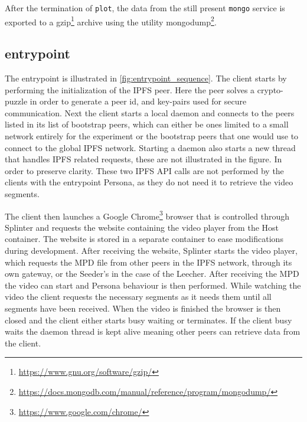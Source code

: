 After the termination of \texttt{plot}, the data from the still present \texttt{mongo} service is exported to a gzip\footnote{\url{https://www.gnu.org/software/gzip/}} archive using the utility mongodump\footnote{\url{https://docs.mongodb.com/manual/reference/program/mongodump/}}. 

\subsection{entrypoint}
\label{sec:experiment_entrypoint}

The entrypoint is illustrated in \autoref{fig:entrypoint_sequence}. The client starts by performing the initialization of the \ac{IPFS} peer. Here the peer solves a crypto-puzzle in order to generate a peer id, and key-pairs used for secure communication.
Next the client starts a local daemon and connects to the peers listed in its list of bootstrap peers, which can either be ones limited to a small network entirely for the experiment or the bootstrap peers that one would use to connect to the global \ac{IPFS} network.
Starting a daemon also starts a new thread that handles \ac{IPFS} related requests, these are not illustrated in the figure. In order to preserve clarity. These two \ac{IPFS} \ac{API} calls are not performed by the clients with the entrypoint Persona, as they do not need it to retrieve the video segments.

The client then launches a Google Chrome\footnote{\url{https://www.google.com/chrome/}} browser that is controlled through Splinter and requests the website containing the video player from the Host container. The website is stored in a separate container to ease modifications during development.
After receiving the website, Splinter starts the video player, which requests the \ac{MPD} file from other peers in the \ac{IPFS} network, through its own gateway, or the Seeder's in the case of the Leecher.
After receiving the \ac{MPD} the video can start and Persona behaviour is then performed. While watching the video the client requests the necessary segments as it needs them until all segments have been received.
When the video is finished the browser is then closed and the client either starts busy waiting or terminates. If the client busy waits the daemon thread is kept alive meaning other peers can retrieve data from the client.




